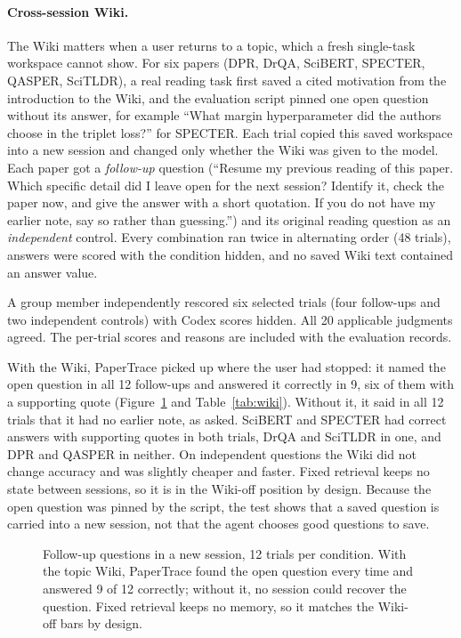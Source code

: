 \documentclass{article}
\begin{document}
\paragraph{Cross-session Wiki.} The Wiki matters when a user returns to a topic, which a fresh
single-task workspace cannot show. For six papers (DPR, DrQA, SciBERT, SPECTER, QASPER, SciTLDR), a
real reading task first saved a cited motivation from the introduction to the Wiki, and the
evaluation script pinned one open question without its answer, for example ``What margin
hyperparameter did the authors choose in the triplet loss?'' for SPECTER. Each trial copied this
saved workspace into a new session and changed only whether the Wiki was given to the model. Each
paper got a \emph{follow-up} question (``Resume my previous reading of this paper. Which specific
detail did I leave open for the next session? Identify it, check the paper now, and give the answer
with a short quotation. If you do not have my earlier note, say so rather than guessing.'') and its
original reading question as an \emph{independent} control. Every combination ran twice in alternating
order (48 trials), answers were scored with the condition hidden, and no saved Wiki text contained an
answer value.

A group member independently rescored six selected trials (four follow-ups and two independent
controls) with Codex scores hidden. All 20 applicable judgments agreed. The per-trial scores and
reasons are included with the evaluation records.

With the Wiki, PaperTrace picked up where the user had stopped: it named the open question in all
12 follow-ups and answered it correctly in 9, six of them with a supporting quote
(Figure~\ref{fig:wiki} and Table~\ref{tab:wiki}). Without it, it said in all 12 trials that it had
no earlier note, as asked. SciBERT and SPECTER had correct answers with supporting quotes in both trials, DrQA and SciTLDR
in one, and DPR and QASPER in neither. On independent questions the Wiki did not change accuracy and
was slightly cheaper and faster. Fixed retrieval keeps no state between sessions, so it is in the
Wiki-off position by design. Because the open question was pinned by the script, the test shows that
a saved question is carried into a new session, not that the agent chooses good questions to save.

\begin{figure}[H]
  \centering
  \begin{minipage}{0.62\linewidth}
    \centering
    
  \end{minipage}
  \caption{Follow-up questions in a new session, 12 trials per condition. With the topic Wiki,
  PaperTrace found the open question every time and answered 9 of 12 correctly; without it, no
  session could recover the question. Fixed retrieval keeps no memory, so it matches the Wiki-off
  bars by design.}
  \label{fig:wiki}
\end{figure}
\end{document}
